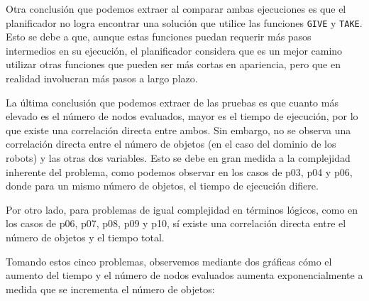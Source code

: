\documentclass{article}
\begin{document}
Otra conclusión que podemos extraer al comparar ambas ejecuciones es que el planificador no logra encontrar una solución que utilice las funciones
 \texttt{GIVE} y \texttt{TAKE}. Esto se debe a que, aunque estas funciones puedan requerir más pasos intermedios en su ejecución, 
 el planificador considera que es un mejor camino utilizar otras funciones que pueden ser más cortas en apariencia, pero que en realidad 
 involucran más pasos a largo plazo.
 

La última conclusión que podemos extraer de las pruebas es que cuanto más elevado es el número de nodos evaluados, mayor es el tiempo de ejecución, por lo que existe una correlación directa entre ambos. Sin embargo, no se observa una correlación directa entre el número de objetos (en el caso del dominio de los robots) y las otras dos variables. Esto se debe en gran medida a la complejidad inherente del problema, como podemos observar en los casos de p03, p04 y p06, donde para un mismo número de objetos, el tiempo de ejecución difiere.

Por otro lado, para problemas de igual complejidad en términos lógicos, como en los casos de p06, p07, p08, p09 y p10, sí existe una correlación directa entre el número de objetos y el tiempo total.

Tomando estos cinco problemas, observemos mediante dos gráficas cómo el aumento del tiempo y el número de nodos evaluados aumenta exponencialmente a medida que se incrementa el número de objetos:


\begin{center}
\end{center}

\begin{center}
\end{center}
\end{document}
